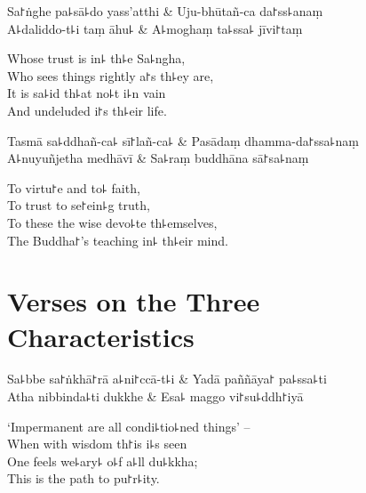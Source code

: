 \begin{twochants}
  Sa꜓ṅghe pa꜕sā꜕do yass'atthi & Uju-bhūtañ-ca da꜓ss꜕anaṃ \\
  A꜕daliddo-t꜕i taṃ āhu꜕ & A꜕moghaṃ ta꜕ssa꜕ jīvi꜓taṃ \\
\end{twochants}

\begin{english}
  Whose trust is in꜕ th꜕e Sa꜕ngha,\\
  Who sees things rightly a꜓s th꜕ey are,\\
  It is sa꜕id th꜕at no꜕t i꜕n vain\\
  And undeluded i꜓s th꜕eir life.
\end{english}

\begin{twochants}
  Tasmā sa꜕ddhañ-ca꜕ sī꜓lañ-ca꜕ & Pasādaṃ dhamma-da꜓ssa꜕naṃ \\
  A꜕nuyuñjetha medhāvī & Sa꜕raṃ buddhāna sā꜓sa꜕naṃ \\
\end{twochants}

\begin{english}
  To virtu꜓e and to꜕ faith,\\
  To trust to se꜓ein꜕g truth,\\
  To these the wise devo꜕te th꜕emselves,\\
  The Buddha꜓'s teaching in꜕ th꜕eir mind.
\end{english}

\chapter{Verses on the Three Characteristics}%

\begin{leader}
\end{leader}

\begin{twochants}
  Sa꜕bbe sa꜓ṅkhā꜓rā a꜕ni꜓ccā-t꜕i & Yadā paññāya꜓ pa꜕ssa꜕ti \\
  Atha nibbinda꜕ti dukkhe & Esa꜕ maggo vi꜓su꜕ddh꜓iyā \\
\end{twochants}

\begin{english}
  `Impermanent are all condi꜕tio꜕ned things' --\\
  When with wisdom th꜓is i꜕s seen\\
  One feels we꜕ary꜕ o꜕f a꜕ll du꜕kkha;\\
  This is the path to pu꜓r꜕ity.
\end{english}

